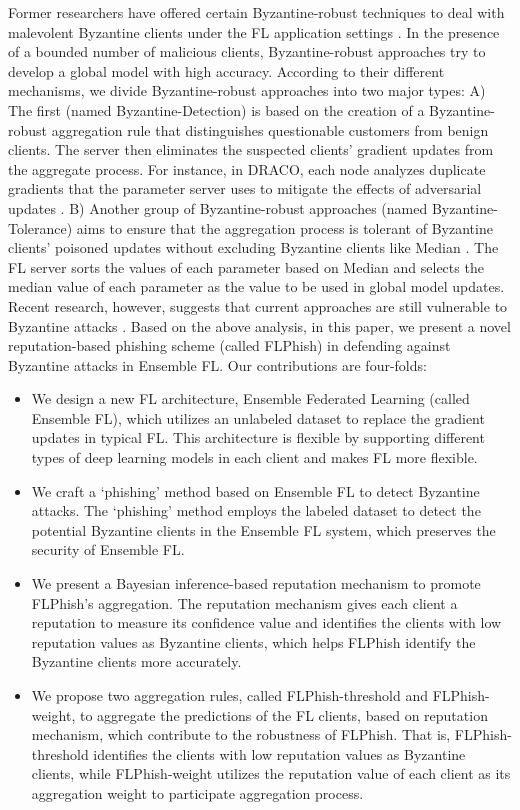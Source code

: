 \documentclass[journal]{IEEEtran}
\begin{document}
\par Former researchers have offered certain Byzantine-robust techniques to deal with malevolent Byzantine clients under the FL application settings \cite{ref_12_defense,ref_13_defense,ref_15_defense,ref_16_defense,ref_17_defense,ref_28_defense,ref_29_defense,ref_30_defense,ref_31_defense,ref_32_defense}. In the presence of a bounded number of malicious clients, Byzantine-robust approaches try to develop a global model with high accuracy. According to their different mechanisms, we divide Byzantine-robust approaches into two major types: A) The first (named Byzantine-Detection) is based on the creation of a Byzantine-robust aggregation rule that distinguishes questionable customers from benign clients. The server then eliminates the suspected clients' gradient updates from the aggregate process. For instance, in DRACO, each node analyzes duplicate gradients that the parameter server uses to mitigate the effects of adversarial updates \cite{ref_13_defense}. B) Another group of Byzantine-robust approaches (named Byzantine-Tolerance) aims to ensure that the aggregation process is tolerant of Byzantine clients' poisoned updates without excluding Byzantine clients like Median \cite{ref_16_defense}. The FL server sorts the values of each parameter based on Median and selects the median value of each parameter as the value to be used in global model updates. Recent research, however, suggests that current approaches are still vulnerable to Byzantine attacks \cite{ref_06_model}. Based on the above analysis, in this paper, we present a novel reputation-based phishing scheme (called FLPhish) in defending against Byzantine attacks in Ensemble FL. Our contributions are four-folds:
\begin{itemize}
  \item We design a new FL architecture, Ensemble Federated Learning (called Ensemble FL), which utilizes an unlabeled dataset to replace the gradient updates in typical FL. This architecture is flexible by supporting different types of deep learning models in each client and makes FL more flexible.
  \item We craft a `phishing' method based on Ensemble FL to detect Byzantine attacks. The `phishing' method employs the labeled dataset to detect the potential Byzantine clients in the Ensemble FL system, which preserves the security of Ensemble FL.
  \item We present a Bayesian inference-based reputation mechanism to promote FLPhish's aggregation. The reputation mechanism gives each client a reputation to measure its confidence value and identifies the clients with low reputation values as Byzantine clients, which helps FLPhish identify the Byzantine clients more accurately.
  \item We propose two aggregation rules, called FLPhish-threshold and FLPhish-weight, to aggregate the predictions of the FL clients, based on reputation mechanism, which contribute to the robustness of FLPhish. That is, FLPhish-threshold identifies the clients with low reputation values as Byzantine clients, while FLPhish-weight utilizes the reputation value of each client as its aggregation weight to participate aggregation process.
\end{itemize}
\end{document}
